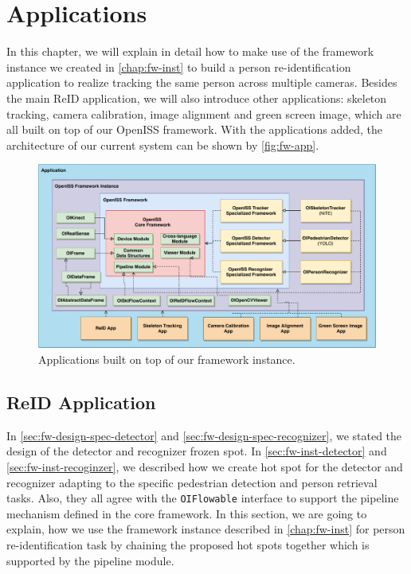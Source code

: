 \chapter{Applications}
\label{chap:fw-app}

In this chapter, we will explain in detail how to make use of the framework
instance we created in \autoref{chap:fw-inst} to build a person
re-identification application to realize tracking the same person across
multiple cameras. Besides the main ReID application, we will also introduce other
applications: skeleton tracking, camera calibration, image alignment
and green screen image, which are all built on top of our OpenISS framework. With the
applications added, the architecture of our current system can be shown by
\autoref{fig:fw-app}.

\begin{figure}
    \centering
    \includegraphics[width=\linewidth]{figures/framework_app.pdf}
    \caption{Applications built on top of our framework instance.}
    \label{fig:fw-app}
\end{figure}

\section{ReID Application}
\label{sec:fw-app-reid}

In \autoref{sec:fw-design-spec-detector} and
\autoref{sec:fw-design-spec-recognizer}, we stated the design of the detector
and recognizer frozen spot. In \autoref{sec:fw-inst-detector} and
\autoref{sec:fw-inst-recoginzer}, we described how we create hot spot for the
detector and recognizer adapting to the specific pedestrian detection and
person retrieval tasks. Also, they all agree with the \texttt{OIFlowable}
interface to support the pipeline mechanism defined in the core framework.
In this section, we are going to explain, how we use the framework instance
described in \autoref{chap:fw-inst} for person re-identification task by
chaining the proposed hot spots together which is supported by the pipeline module.

